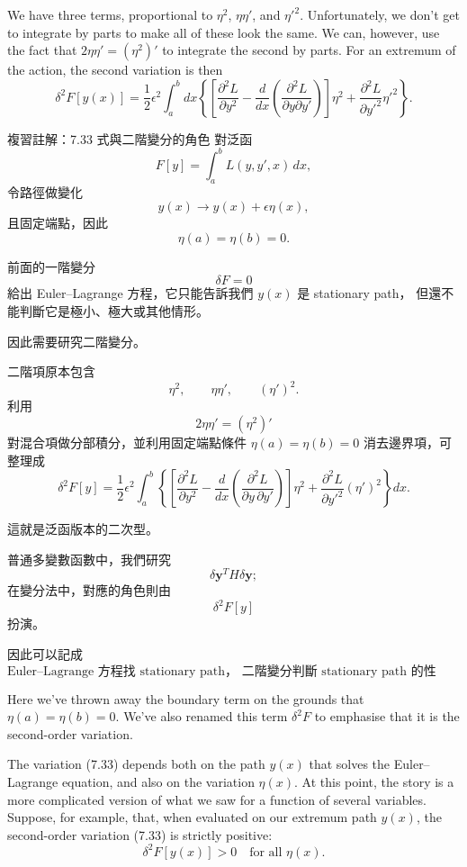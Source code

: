\documentclass[11pt,a4paper,twoside]{article}
\newcommand{\pnum}[1]{\makebox[0pt][r]{\scriptsize\textbf{[#1]}\hspace{0.7em}}}
\newcommand{\StudyNote}[2]{\begin{studyNote}{#1}#2\end{studyNote}}
\begin{document}
\noindent\pnum{50}We have three terms, proportional to $\eta^2$, $\eta\eta'$, and $\eta'^2$. Unfortunately, we don't get to integrate by parts to make all of these look the same. We can, however, use the fact that $2\eta\eta'=(\eta^2)'$ to integrate the second by parts. For an extremum of the action, the second variation is then
\begin{equation}
    \delta^2 F[y(x)]=\frac12\epsilon^2\int_a^b dx\left\{
    \left[\frac{\partial^2 L}{\partial y^2}
        -\frac{d}{dx}\left(\frac{\partial^2 L}{\partial y\partial y'}\right)\right]\eta^2
    +\frac{\partial^2 L}{\partial y'^2}\eta'^2\right\}.
    \tag{7.33}
\end{equation}
\StudyNote{複習註解：7.33 式與二階變分的角色}{
對泛函
\[
    F[y]=\int_a^b L(y,y',x)\,dx,
\]
令路徑做變化
\[
    y(x)\to y(x)+\epsilon\eta(x),
\]
且固定端點，因此
\[
    \eta(a)=\eta(b)=0.
\]

前面的一階變分
\[
    \delta F=0
\]
給出 Euler--Lagrange 方程，它只能告訴我們 $y(x)$ 是 stationary path，
但還不能判斷它是極小、極大或其他情形。

因此需要研究二階變分。

二階項原本包含
\[
    \eta^2,\qquad \eta\eta',\qquad (\eta')^2.
\]
利用
\[
    2\eta\eta'=(\eta^2)'
\]
對混合項做分部積分，並利用固定端點條件
$\eta(a)=\eta(b)=0$ 消去邊界項，可整理成
\[
    \delta^2F[y]
    =
    \frac12\epsilon^2
    \int_a^b
    \left\{
    \left[
        \frac{\partial^2L}{\partial y^2}
        -
        \frac{d}{dx}
        \left(
        \frac{\partial^2L}{\partial y\,\partial y'}
        \right)
        \right]\eta^2
    +
    \frac{\partial^2L}{\partial y'^2}(\eta')^2
    \right\}dx.
\]

這就是泛函版本的二次型。

普通多變數函數中，我們研究
\[
    \delta\mathbf y^T H\delta\mathbf y;
\]
在變分法中，對應的角色則由
\[
    \delta^2F[y]
\]
扮演。

因此可以記成
\[
    \boxed{
        \text{Euler--Lagrange 方程找 stationary path，
            二階變分判斷 stationary path 的性質。}
    }
\]
}

\noindent\pnum{51}Here we've thrown away the boundary term on the grounds that $\eta(a)=\eta(b)=0$. We've also renamed this term $\delta^2 F$ to emphasise that it is the second-order variation.

\noindent\pnum{52}The variation (7.33) depends both on the path $y(x)$ that solves the Euler--Lagrange equation, and also on the variation $\eta(x)$. At this point, the story is a more complicated version of what we saw for a function of several variables. Suppose, for example, that, when evaluated on our extremum path $y(x)$, the second-order variation (7.33) is strictly positive:
\begin{equation}
    \delta^2 F[y(x)]>0\quad\text{for all }\eta(x).
    \tag{7.34}
\end{equation}
\end{document}
